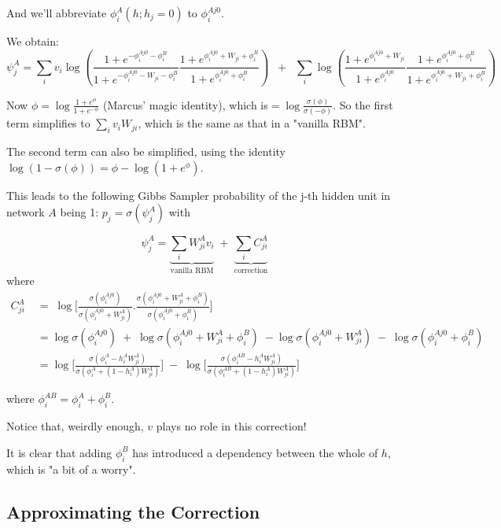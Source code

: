 And we'll abbreviate $\phi^A_i(h ; h_j=0)$ to $\phi^{Aj0}_i$.

We obtain:
$$\psi^A_j = \sum_i v_i \log \left( \frac{1+ e^{-\phi^{Aj0}_i - \phi^B_i}}{1+e^{-\phi^{Aj0}_i - W_{ji} -\phi^B_i}} \frac{1+ e^{\phi^{Aj0}_i + W_{ji} + \phi^B_i}}{1+e^{\phi_i^{Aj0} + \phi^B_i}}\right) \;\;+ \;\;\sum_i \log \left(\frac{1+e^{\phi_i^{Aj0} + W_{ji}}}{1+ e^{\phi_i^{Aj0}}}
\frac{1+e^{\phi_i^{Aj0} + \phi^B_i}}{1+ e^{\phi_i^{Aj0} + W_{ji} + \phi^B_i}} \right)
$$

Now $\phi = \log \frac{1+e^{\phi}}{1+e^{-\phi}}$ (Marcus' magic identity), which is$ = \log \frac{\sigma(\phi)}{\sigma(-\phi)}$.
So the first term simplifies to
$ \sum_i v_i W_{ji}$, which is the same as that in a "vanilla RBM".

The second term can also be simplified, using the identity $\log(1-\sigma(\phi)) = \phi - \log(1+e^\phi)$.

This leads to the following Gibbs Sampler probability of the j-th hidden unit in network $A$ being 1: $p_j = \sigma(\psi_j^A)$ with

$$\psi_j^A = \underbrace{\sum_i W^A_{ji} v_i}_\text{vanilla RBM} \; + \; \underbrace{\sum_i C^A_{ji}}_\text{correction} $$
where
$$
\begin{aligned}
C^A_{ji} \; &= \;\log \bigg[ \frac{\sigma (\phi_i^{Aj0})}{\sigma (\phi_i^{Aj0} + W^A_{ji})} . \frac{\sigma (\phi_i^{Aj0} + W_{ji}^A + \phi_i^B) }{\sigma (\phi_i^{Aj0} + \phi_i^B)} \bigg]
\\
&= \log \sigma(\phi_i^{Aj0})  \; + \; \log \sigma (\phi_i^{Aj0} + W^A_{ji} + \phi_i^B) \;- \log \sigma (\phi_i^{Aj0} + W^A_{ji})  \; - \; \log \sigma ( \phi_i^{Aj0} + \phi_i^B)
\\
&= \log \bigg[ \frac{\sigma(\phi_i^{A} - h^A_i W^A_{ji})}{\sigma (\phi_i^{A} + (1-h^A_i) W^A_{ji})} \bigg]  \; - \; \log \bigg[ \frac{ \sigma ( \phi_i^{AB} - h^A_i W^A_{ji})}{\sigma (\phi_i^{AB} + (1-h^A_i) W^A_{ji})} \bigg]
\end{aligned} $$

where $\phi_i^{AB} = \phi_i^{A} + \phi_i^{B}$.

Notice that, weirdly enough, $v$ plays no role in this correction!

It is clear that adding $\phi^B_i$ has introduced a dependency between the whole of $h$, which is "a bit of a worry".


\subsection{Approximating the Correction}

